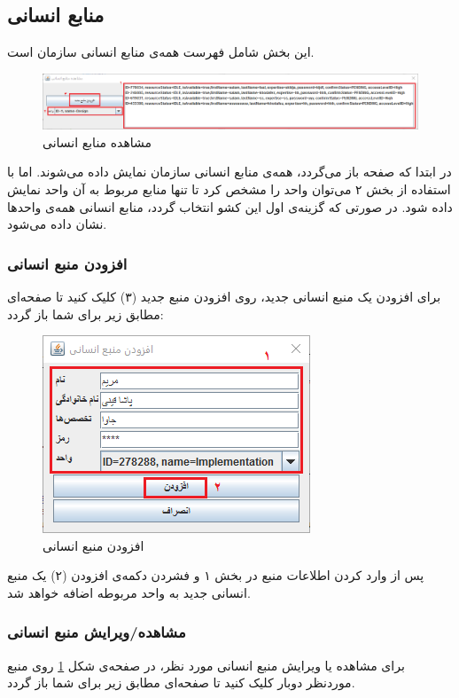 \subsection{منابع انسانی}
این بخش شامل فهرست همه‌ی منابع انسانی سازمان است.
	\begin{figure}[H]
		\centering
		\includegraphics[scale=0.5]{img/manual/hRess}
		\caption{مشاهده منابع انسانی}
		\label{f10}
	\end{figure}

در ابتدا که صفحه باز می‌گردد، همه‌ی منابع انسانی سازمان نمایش داده می‌شوند. اما با استفاده از بخش ۲ می‌توان واحد را مشخص کرد تا تنها منابع مربوط به آن واحد نمایش داده شود. در صورتی که گزینه‌ی اول این کشو انتخاب گردد، منابع انسانی همه‌ی واحدها نشان داده می‌شود.
\subsubsection{افزودن منبع انسانی}
برای افزودن یک منبع انسانی جدید، روی افزودن منبع جدید (۳) کلیک کنید تا صفحه‌ای مطابق زیر برای شما باز گردد:
	\begin{figure}[H]
		\centering
		\includegraphics[scale=0.9]{img/manual/addHRess}
		\caption{افزودن منبع انسانی}
	\end{figure}
پس از وارد کردن اطلاعات منبع در بخش ۱ و فشردن دکمه‌ی افزودن (۲) یک منبع انسانی جدید به واحد مربوطه اضافه خواهد شد.

\subsubsection{مشاهده/ویرایش منبع انسانی}
برای مشاهده یا ویرایش منبع انسانی مورد نظر، در صفحه‌ی شکل
\ref{f10}
 روی منبع موردنظر دوبار کلیک کنید تا صفحه‌ای مطابق زیر برای شما باز گردد.

